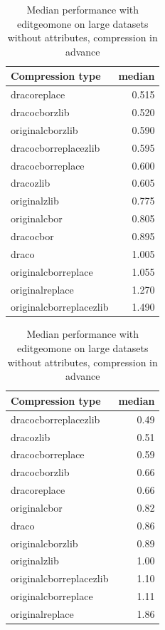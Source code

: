   \begin{table}[!h]
    \begin{minipage}{.5\linewidth}
      \caption{
Median performance with editgeomone on large datasets, compression in advance}
\centering

\begin{tabular}{|l|r|}
\hline
Compression type & median\\
\hline
dracoreplace & 0.515\\
\hline
dracocborzlib & 0.520\\
\hline
originalcborzlib & 0.590\\
\hline
dracocborreplacezlib & 0.595\\
\hline
dracocborreplace & 0.600\\
\hline
dracozlib & 0.605\\
\hline
originalzlib & 0.775\\
\hline
originalcbor & 0.805\\
\hline
dracocbor & 0.895\\
\hline
draco & 1.005\\
\hline
originalcborreplace & 1.055\\
\hline
originalreplace & 1.270\\
\hline
originalcborreplacezlib & 1.490\\
\hline
\end{tabular}
\end{minipage}%
    \begin{minipage}{.5\linewidth}
      \centering
        \caption{
Median performance with editgeomone on large datasets without attributes, compression in advance}

\begin{tabular}{|l|r|}
\hline
Compression type & median\\
\hline
dracocborreplacezlib & 0.49\\
\hline
dracozlib & 0.51\\
\hline
dracocborreplace & 0.59\\
\hline
dracocborzlib & 0.66\\
\hline
dracoreplace & 0.66\\
\hline
originalcbor & 0.82\\
\hline
draco & 0.86\\
\hline
originalcborzlib & 0.89\\
\hline
originalzlib & 1.00\\
\hline
originalcborreplacezlib & 1.10\\
\hline
originalcborreplace & 1.11\\
\hline
originalreplace & 1.86\\
\hline
\end{tabular}
\end{minipage} 
\end{table}
